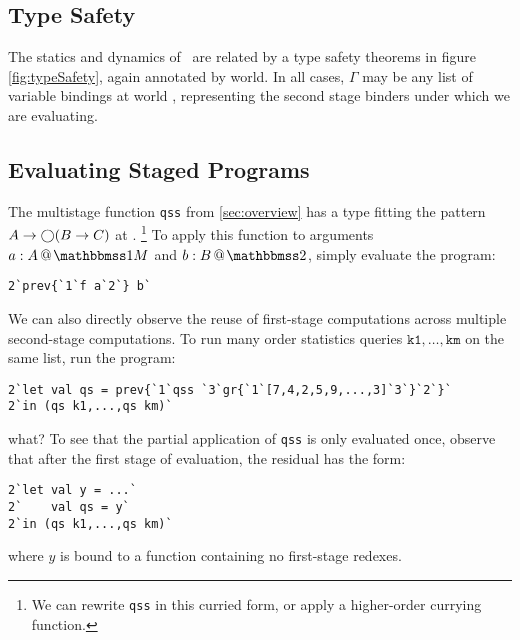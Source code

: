 \subsection{Type Safety}

The statics and dynamics of \lang\ are related by a type safety theorems
in figure \ref{fig:typeSafety}, again annotated by world.
In all cases, $\Gamma$ may be any list of variable bindings at world \bbtwo,
representing the second stage binders under which we are evaluating.


\subsection{Evaluating Staged Programs}

The multistage function \texttt{qss} from \ref{sec:overview} has a
type fitting the pattern \mbox{$A\to \bigcirc (B \to C)$} at \bbonem.%
\footnote{We can rewrite \texttt{qss} in this curried form, or apply a
higher-order currying function.} 
To apply this function to arguments $\colmix a A$ and $\coltwo b B$, simply
evaluate the program:
\begin{lstlisting}
2`prev{`1`f a`2`} b`
\end{lstlisting}

We can also directly observe the reuse of first-stage computations across
multiple second-stage computations. To run many order statistics queries
$\texttt{k1},\dots,\texttt{km}$ on the same list, run the program:
\begin{lstlisting}
2`let val qs = prev{`1`qss `3`gr{`1`[7,4,2,5,9,...,3]`3`}`2`}`
2`in (qs k1,...,qs km)`
\end{lstlisting}
\TODO what?
To see that the partial application of \texttt{qss} is only evaluated once,
observe that after the first stage of evaluation, the residual has the form:
\begin{lstlisting}
2`let val y = ...`
2`    val qs = y`
2`in (qs k1,...,qs km)`
\end{lstlisting}
where $y$ is bound to a function containing no first-stage redexes.

